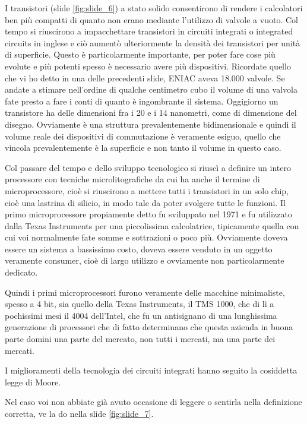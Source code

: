 I transistori (slide \ref{fig:slide_6}) a stato solido consentirono di rendere i calcolatori ben più compatti di quanto non erano mediante l'utilizzo di valvole a vuoto.
Col tempo si riuscirono a impacchettare transistori in circuiti integrati o integrated circuits in inglese e ciò aumentò ulteriormente la densità dei transistori per unità di superficie.
Questo è particolarmente importante, per poter fare cose più evolute e più potenti spesso è necessario avere più dispositivi.
Ricordate quello che vi ho detto in una delle precedenti slide, ENIAC aveva 18.000 valvole.
Se andate a stimare nell'ordine di qualche centimetro cubo il volume di una valvola fate presto a fare i conti di quanto è ingombrante il sistema.
Oggigiorno un transistore ha delle dimensioni fra i 20 e i 14 nanometri, come di dimensione del disegno.
Ovviamente è una struttura prevalentemente bidimensionale e quindi il volume reale dei dispositivi di commutazione è veramente esiguo, quello che vincola prevalentemente è la superficie e non tanto il volume in questo caso.

Col passare del tempo e dello sviluppo tecnologico si riuscì a definire un intero processore con tecniche microlitografiche da cui ha anche il termine di microprocessore, cioè si riuscirono a mettere tutti i transistori in un solo chip, cioè una lastrina di silicio, in modo tale da poter svolgere tutte le funzioni.
Il primo microprocessore propiamente detto fu sviluppato nel 1971 e fu utilizzato dalla Texas Instruments per una piccolissima calcolatrice, tipicamente quella con cui voi normalmente fate somme e sottrazioni o poco più.
Ovviamente doveva essere un sistema a bassissimo costo, doveva essere venduto in un oggetto veramente consumer, cioè di largo utilizzo e ovviamente non particolarmente dedicato.

Quindi i primi microprocessori furono veramente delle macchine minimaliste, spesso a 4 bit, sia quello della Texas Instruments, il TMS 1000, che di lì a pochissimi mesi il 4004 dell'Intel, che fu un antisignano di una lunghissima generazione di processori che di fatto determinano che questa azienda in buona parte domini una parte del mercato, non tutti i mercati, ma una parte dei mercati.

I miglioramenti della tecnologia dei circuiti integrati hanno seguito la cosiddetta legge di Moore.

Nel caso voi non abbiate già avuto occasione di leggere o sentirla nella definizione corretta, ve la do nella slide \ref{fig:slide_7}.

